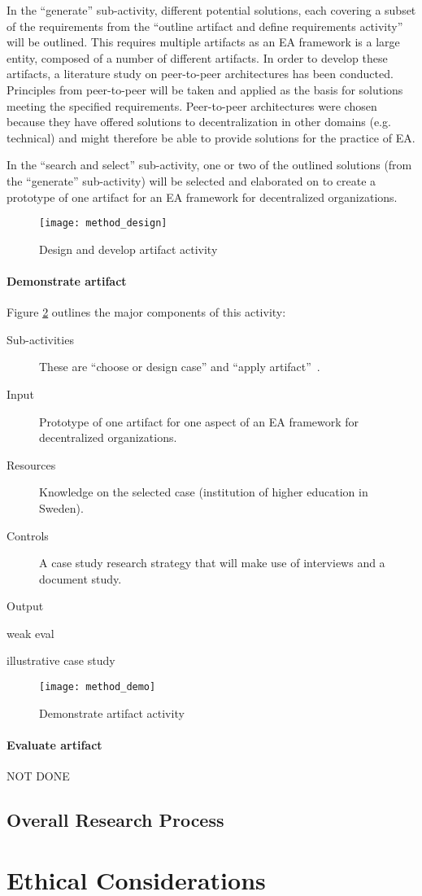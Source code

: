 In the ``generate'' sub-activity, different potential solutions, each covering a subset of the requirements from the ``outline artifact and define requirements activity'' will be outlined. This requires multiple artifacts as an EA framework is a large entity, composed of a number of different artifacts. In order to develop these artifacts, a literature study on peer-to-peer architectures has been conducted. Principles from peer-to-peer will be taken and applied as the basis for solutions meeting the specified requirements. Peer-to-peer architectures were chosen because they have offered solutions to decentralization in other domains (e.g. technical) and might therefore be able to provide solutions for the practice of EA. 

In the ``search and select'' sub-activity, one or two of the outlined solutions (from the ``generate'' sub-activity) will be selected and elaborated on to create a prototype of one artifact for an EA framework for decentralized organizations. 

\begin{figure}
\centering
\texttt{[image: method\_design]}
\caption{Design and develop artifact activity}
\label{fig:method_design}
\end{figure}
  
\paragraph*{Demonstrate artifact}

Figure \ref{fig:method_demo} outlines the major components of this activity:
\begin{description}
  \item[Sub-activities] These are ``choose or design case'' and ``apply artifact''~\cite[Ch. 8]{johannessonPerjons2012}.
  \item[Input] Prototype of one artifact for one aspect of an EA framework for decentralized organizations. 
  \item[Resources] Knowledge on the selected case (institution of higher education in Sweden). 
  \item[Controls] A case study research strategy that will make use of interviews and a document study.
  \item[Output]  
\end{description}

weak eval

illustrative case study

\begin{figure}
\centering
\texttt{[image: method\_demo]}
\caption{Demonstrate artifact activity}
\label{fig:method_demo}
\end{figure}

\paragraph*{Evaluate artifact}

NOT DONE

\subsection{Overall Research Process}



\section{Ethical Considerations}
